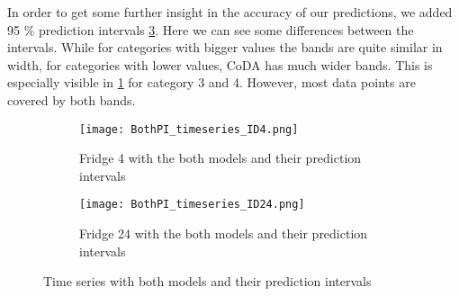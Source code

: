 In order to get some further insight in the accuracy of our predictions, we added 95 \% prediction intervals \ref{fig:TS BothPI}. Here we can see some differences between the intervals. While for categories with bigger values the bands are quite similar in width, for categories with lower values, CoDA has much wider bands. This is especially visible in \ref{fig:BothPI Fridge 4} for category 3 and 4. However, most data points are covered by both bands.
\begin{figure}[htb]
\centering
\begin{subfigure}[b]{0.8\textwidth}
\texttt{[image: BothPI\_timeseries\_ID4.png]}
\caption{Fridge 4 with the both models and their prediction intervals}
\label{fig:BothPI Fridge 4}
\end{subfigure}
\hfill
\begin{subfigure}[b]{0.8\textwidth}
\texttt{[image: BothPI\_timeseries\_ID24.png]}
\caption{Fridge 24 with the both models and their prediction intervals}
\label{fig:BothPI Fridge 24}
\end{subfigure}
\caption{Time series with both models and their prediction intervals}
\label{fig:TS BothPI}
\end{figure}